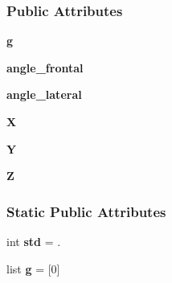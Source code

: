 \subsubsection*{Public Attributes}
\begin{DoxyCompactItemize}
\item 
\hypertarget{classposture_1_1_posture_a8007dea4830a05937eeed93a734e5f91}{{\bfseries g}}\label{classposture_1_1_posture_a8007dea4830a05937eeed93a734e5f91}

\item 
\hypertarget{classposture_1_1_posture_aedef5377473c2e20d16c88440e514763}{{\bfseries angle\-\_\-frontal}}\label{classposture_1_1_posture_aedef5377473c2e20d16c88440e514763}

\item 
\hypertarget{classposture_1_1_posture_a145e040bf762b3169e8157665b31e3f0}{{\bfseries angle\-\_\-lateral}}\label{classposture_1_1_posture_a145e040bf762b3169e8157665b31e3f0}

\item 
\hypertarget{classposture_1_1_posture_abdd37b491d8194f255c0017dcd32b6a6}{{\bfseries X}}\label{classposture_1_1_posture_abdd37b491d8194f255c0017dcd32b6a6}

\item 
\hypertarget{classposture_1_1_posture_a267afdbb1a17dba6c619d3ac2d7a9892}{{\bfseries Y}}\label{classposture_1_1_posture_a267afdbb1a17dba6c619d3ac2d7a9892}

\item 
\hypertarget{classposture_1_1_posture_aa251677d3dcf44e8c7c37007bcbb29d8}{{\bfseries Z}}\label{classposture_1_1_posture_aa251677d3dcf44e8c7c37007bcbb29d8}

\end{DoxyCompactItemize}
\subsubsection*{Static Public Attributes}
\begin{DoxyCompactItemize}
\item 
\hypertarget{classposture_1_1_posture_a8c705a4aac70c0f0de40cdb9bb816516}{int {\bfseries std} = .}\label{classposture_1_1_posture_a8c705a4aac70c0f0de40cdb9bb816516}

\item 
\hypertarget{classposture_1_1_posture_af09f6fce94fafc627216b8a7529d39d7}{list {\bfseries g} = \mbox{[}0\mbox{]}}\label{classposture_1_1_posture_af09f6fce94fafc627216b8a7529d39d7}

\end{DoxyCompactItemize}



